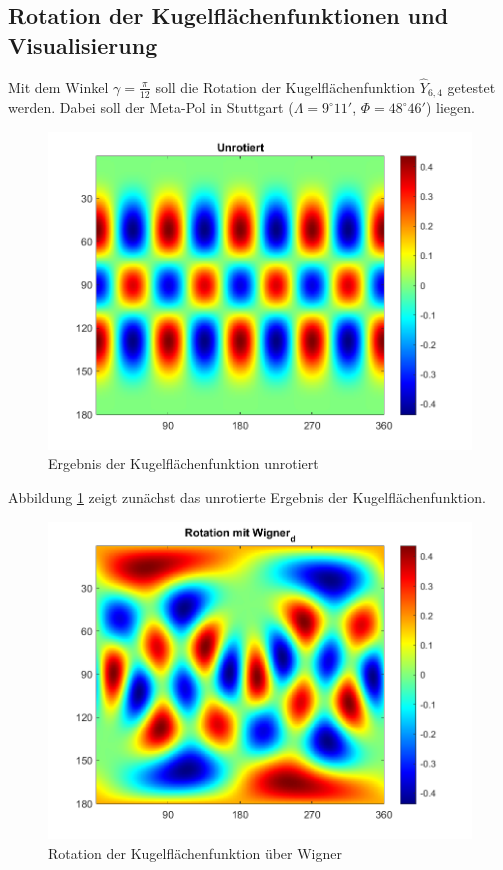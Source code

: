 \subsection{Rotation der Kugelflächenfunktionen und Visualisierung}
Mit dem Winkel $\gamma=\frac{\pi}{12}$ soll die Rotation der Kugelflächenfunktion $\hat{Y}_{6,4}$ getestet werden. Dabei soll der Meta-Pol in Stuttgart ($\Lambda = 9^{\circ}11'$, $\Phi = 48^{\circ}46'$) liegen. 
\begin{figure}[H]
\centering
\includegraphics[scale = 0.6]{unrotiert.png}
\caption{Ergebnis der Kugelflächenfunktion unrotiert}
\label{unrot}
\end{figure}
Abbildung \ref{unrot} zeigt zunächst das unrotierte Ergebnis der Kugelflächenfunktion. 
\begin{figure}[H]
	\centering
	\includegraphics[scale = 0.6]{wigner.png}
	\caption{Rotation der Kugelflächenfunktion über Wigner}
	\label{wigner}
\end{figure}
